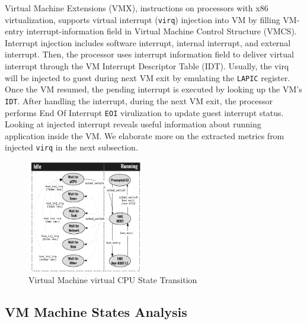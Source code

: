 \documentclass[10pt, conference, compsocconf]{IEEEtran}
\begin{document}
Virtual Machine Extensions (VMX), instructions on processors with x86 virtualization, supports virtual interrupt (\texttt{virq}) injection into VM by filling VM-entry interrupt-information field in Virtual Machine Control Structure (VMCS). Interrupt injection includes software interrupt, internal interrupt, and external interrupt. Then, the processor uses interrupt information field to deliver virtual interrupt through the VM Interrupt Descriptor Table (IDT).  Usually, the virq will be injected to guest during next VM exit by emulating the \texttt{LAPIC} register. Once the VM resumed, the pending interrupt is executed by looking up the VM's \texttt{IDT}. After handling the interrupt, during the next VM exit, the processor performs End Of Interrupt \texttt{EOI} virulization to update guest interrupt status. Looking at injected interrupt reveals useful information about running application inside the VM. We elaborate more on the extracted metrics from injected \texttt{virq} in the next subsection. 



\begin{figure}[h]
\includegraphics[width=0.45\textwidth]{figs/states.pdf}
\caption{Virtual Machine virtual CPU State Transition}
\label{fig:state}
\end{figure}

\subsection{VM Machine States Analysis}
\end{document}
